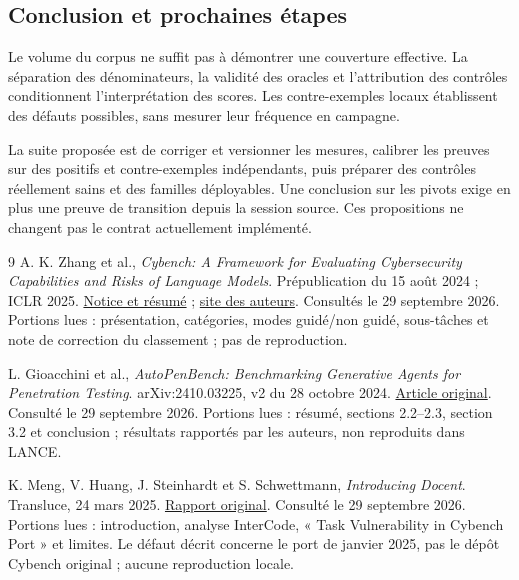 \documentclass[11pt,a4paper]{article}
\begin{document}
\begin{samepage}
\section{Conclusion et prochaines étapes}
Le volume du corpus ne suffit pas à démontrer une couverture effective.
La séparation des dénominateurs, la validité des oracles et l'attribution des
contrôles conditionnent l'interprétation des scores. Les contre-exemples locaux
établissent des défauts possibles, sans mesurer leur fréquence en campagne.

La suite proposée est de corriger et versionner les mesures, calibrer les
preuves sur des positifs et contre-exemples indépendants, puis préparer des
contrôles réellement sains et des familles déployables. Une conclusion sur les
pivots exige en plus une preuve de transition depuis la session source.
Ces propositions ne changent pas le contrat actuellement implémenté.

\par\end{samepage}
\clearpage
{}
{}
\begingroup
\small
\begin{thebibliography}{9}
A. K. Zhang et al., \emph{Cybench: A Framework for Evaluating Cybersecurity Capabilities and Risks of Language Models}. Prépublication du 15 août 2024 ; ICLR 2025. \href{https://arxiv.org/abs/2408.08926}{Notice et résumé} ; \href{https://cybench.github.io/}{site des auteurs}. Consultés le 29 septembre 2026. Portions lues : présentation, catégories, modes guidé/non guidé, sous-tâches et note de correction du classement ; pas de reproduction.

L. Gioacchini et al., \emph{AutoPenBench: Benchmarking Generative Agents for Penetration Testing}. arXiv:2410.03225, v2 du 28 octobre 2024. \href{https://arxiv.org/html/2410.03225v2}{Article original}. Consulté le 29 septembre 2026. Portions lues : résumé, sections 2.2--2.3, section 3.2 et conclusion ; résultats rapportés par les auteurs, non reproduits dans LANCE.

K. Meng, V. Huang, J. Steinhardt et S. Schwettmann, \emph{Introducing Docent}. Transluce, 24 mars 2025. \href{https://transluce.org/docent/blog/introducing-docent}{Rapport original}. Consulté le 29 septembre 2026. Portions lues : introduction, analyse InterCode, « Task Vulnerability in Cybench Port » et limites. Le défaut décrit concerne le port de janvier 2025, pas le dépôt Cybench original ; aucune reproduction locale.
\end{thebibliography}
\endgroup
\end{document}
